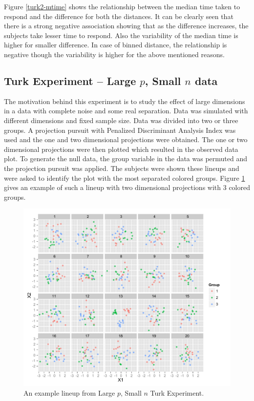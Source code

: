\documentclass[12]{article}
\begin{document}
Figure \ref{turk2-mtime} shows the relationship between the median time taken to respond and the difference for both the distances. It can be clearly seen that there is a strong negative association showing that as the difference increases, the subjects take lesser time to respond. Also the variability of the median time is higher for smaller difference. In case of binned distance, the relationship is negative though the variability is higher for the above mentioned reasons.

\subsection{Turk Experiment -- Large $p$, Small $n$ data}

The motivation behind this experiment is to study the effect of large dimensions in a data with complete noise and some real separation. Data was simulated with different dimensions and fixed sample size. Data was divided into two or three groups. A projection pursuit with Penalized Discriminant Analysis Index was used and the one and two dimensional projections were obtained. The one or two dimensional projections were then plotted which resulted in the observed data plot. To generate the null data, the group variable in the data was permuted and the projection pursuit was applied. The subjects were shown these lineups and were asked to identify the plot with the most separated colored groups. Figure \ref{largep} gives an example of such a lineup with two dimensional projections with 3 colored groups. 

\begin{figure}[htbp]
\centering
\includegraphics[width=.7\textwidth]{largep-example.pdf}
\caption{An example lineup from Large $p$, Small $n$ Turk Experiment.}
\label{largep}
\end{figure}
\end{document}
